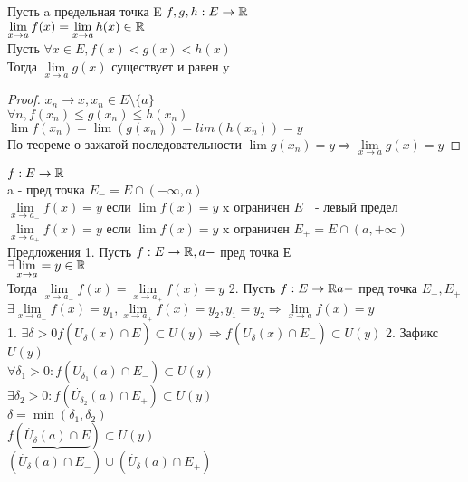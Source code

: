 \begin{enumerate}
	Пусть a  предельная точка E $ f,g,h : E \rightarrow \mathbb{R} $\\
	$  \lim\limits_{x \rightarrow a} f(x) =  \lim\limits_{x \rightarrow a} h(x) \in \mathbb{R} $ \\
	Пусть $ \forall x \in E, f(x) < g(x) < h(x) $ \\
	Тогда $  \lim\limits_{x \rightarrow a} g(x)  $ существует и равен y \\
	\begin{proof}
		$ x_n \rightarrow x, x_n \in E \setminus \{a\} $ \\
		$ \forall n, f(x_n) \leq g(x_n) \leq h(x_n) $ \\
		$ \lim f(x_n) = \lim(g(x_n)) = lim(h(x_n)) = y$\\
		По теореме о зажатой последовательности $ \lim g(x_n) = y \Rightarrow  \lim\limits_{x \rightarrow a} g(x) = y $ 
	\end{proof}
	
\end{enumerate}

$ f : E \rightarrow \mathbb{R} $ \\
a - пред точка $E_- = E \cap (-\infty, a) $\\
$  \lim\limits_{x \rightarrow a_-} f(x) = y $ если $ \lim f(x) = y $ x ограничен $ E_- $ - левый предел \\
$  \lim\limits_{x \rightarrow a_+} f(x) = y $ если $ \lim f(x) = y $ x ограничен $ E_+ = E \cap (a, +\infty)$  \\
Предложения
1. Пусть $ f:E\rightarrow \mathbb{R} ,a - $ пред точка Е \\
$ \exists \lim\limits_{x \rightarrow a} = y \in \mathbb{R} $ \\
Тогда $  \lim\limits_{x \rightarrow a_-} f(x)  =  \lim\limits_{x \rightarrow a_+} f(x)= y$
2. Пусть $ f : E \rightarrow \mathbb{R} a - $ пред точка $ E_-, E_+ $\\
$ \exists  \lim\limits_{x \rightarrow a_-} f(x) = y_1,  \lim\limits_{x \rightarrow a_+} f(x) = y_2, y_1 = y_2 \Rightarrow  \lim\limits_{x \rightarrow a} f(x) = y $ \\
1. $ \exists \delta > 0 f(\dot{U_{\delta}}(x) \cap E ) \subset U(y)  \Rightarrow  f(\dot{U_{\delta}}(x) \cap E_- ) \subset U(y)   $
2. Зафикс $ U(y) $ \\
$ \forall \delta_1 > 0 : f(\dot{U_{\delta_1}} (a) \cap E_-) \subset U(y) $ \\
$ \exists \delta_2 > 0 : f(\dot{U_{\delta_2}}(a) \cap E_+) \subset U(y) $ \\
$ \delta = \min(\delta_1, \delta_2) $ \\
$ f(\underbrace{\dot{U_{\delta}}(a) \cap E}) \subset U(y) $ \\
$ (\dot{U_{\delta}}(a) \cap E_-) \cup (\dot{U_{\delta}}(a) \cap E_+) $

